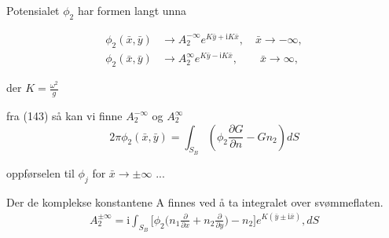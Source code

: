 Potensialet $\phi_2$ har formen langt unna

\begin{align}
	\phi_2(\bar{x},\bar{y}) &\rightarrow A_2^{-\infty} e^{K\bar{y} + \mathrm{i} K\bar{x}}, \quad \bar{x} \rightarrow -\infty, \\
	\phi_2(\bar{x},\bar{y}) &\rightarrow A_2^{\infty} e^{K\bar{y} - \textsf{i} K\bar{x}}, \qquad \bar{x} \rightarrow \infty,
\end{align}

der $K = \frac{\omega^2}{g}$

fra (143) så kan vi finne $A_2^{-\infty}$ og $A_2^{\infty}$
\begin{equation}
    2\pi \phi_2(\bar{x},\bar{y})  = \int_{S_B}  ( \phi_2  \frac{\partial G }{\partial n}-G n_2 )dS \tag{143}
\end{equation}

oppførselen til $\phi_j$ for $\bar{x} \rightarrow \pm \infty$
...

Der de komplekse konstantene A finnes ved å ta integralet over svømmeflaten.
\begin{align}
A_2^{\pm \infty} =  \mathrm{i} \int_{S_B}   \bigg[ \phi_2  \Big(  n_1 \frac{\partial }{\partial x}  +  n_2\frac{\partial }{\partial y} \Big) - n_2 \bigg]  e^{K (\bar{y} \pm \mathrm{i}  \bar{x}) },dS
\end{align}



